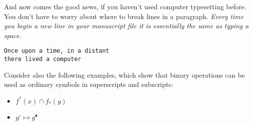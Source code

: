 \documentclass[11pt]{article}
\begin{document}
\sloppypar
And now comes the good news, if you haven't used
computer typesetting before. You don't have to worry about where to
break lines in a paragraph.
\textit{Every time you begin a new line in your manuscript file 
it is essentially the same as typing a space.}

\begin{verbatim}
Once upon a time, in a distant
there lived a computer
\end{verbatim}

Consider also the following examples, which show that binary operations
can be used as ordinary symbols in superscripts and subscripts:

\begin{itemize}
\item $f^*(x) \cap f_*(y)$
\item $g^\circ \mapsto g^\bullet$
\end{itemize}
\end{document}
